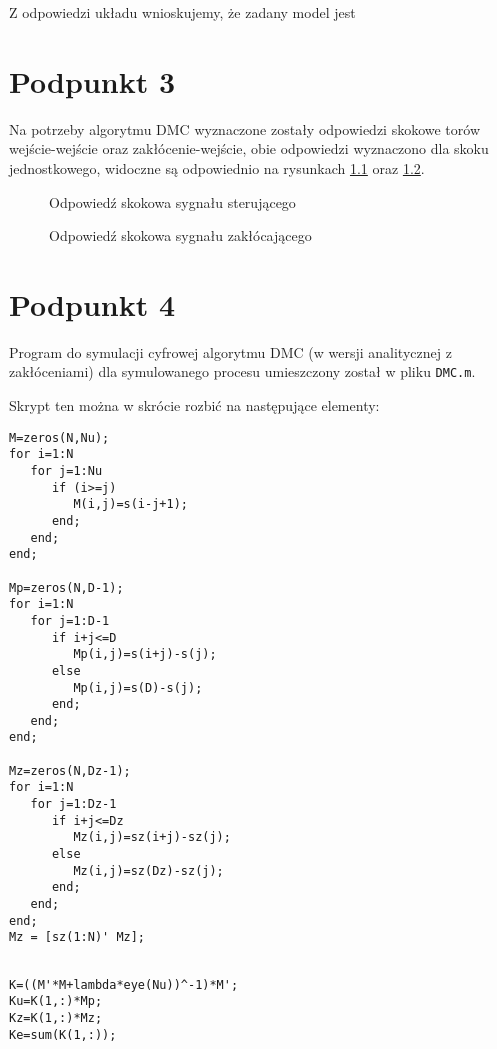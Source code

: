 Z odpowiedzi układu wnioskujemy, że zadany model jest %


\chapter{Podpunkt 3}
Na potrzeby algorytmu DMC wyznaczone zostały odpowiedzi skokowe torów wejście-wejście oraz zakłócenie-wejście, obie odpowiedzi wyznaczono dla skoku jednostkowego, widoczne są odpowiednio na rysunkach \ref{Z3a} oraz \ref{Z3b}.

\begin{figure}[ht]
\centering

\caption{Odpowiedź skokowa sygnału sterującego}
\label{Z3a}
\end{figure}

\begin{figure}[ht]
\centering

\caption{Odpowiedź skokowa sygnału zakłócającego}
\label{Z3b}
\end{figure}


\chapter{Podpunkt 4}
Program do symulacji cyfrowej algorytmu DMC (w wersji analitycznej z zakłóceniami) dla symulowanego procesu umieszczony został w pliku \verb+DMC.m+.

Skrypt ten można w skrócie rozbić na następujące elementy:


\begin{lstlisting}[style=Matlab-editor]
%generacja macierzy
M=zeros(N,Nu);
for i=1:N
   for j=1:Nu
      if (i>=j)
         M(i,j)=s(i-j+1);
      end;
   end;
end;

Mp=zeros(N,D-1);
for i=1:N
   for j=1:D-1
      if i+j<=D
         Mp(i,j)=s(i+j)-s(j);
      else
         Mp(i,j)=s(D)-s(j);
      end;
   end;
end;

Mz=zeros(N,Dz-1);
for i=1:N
   for j=1:Dz-1
      if i+j<=Dz
         Mz(i,j)=sz(i+j)-sz(j);
      else
         Mz(i,j)=sz(Dz)-sz(j);
      end;
   end;
end;
Mz = [sz(1:N)' Mz];
\end{lstlisting} 

\begin{lstlisting}[style=Matlab-editor]
%przeksztalcanie wyliczonych macierzy do potrzebnych nam parametrow

K=((M'*M+lambda*eye(Nu))^-1)*M';
Ku=K(1,:)*Mp;
Kz=K(1,:)*Mz;
Ke=sum(K(1,:));
\end{lstlisting}

